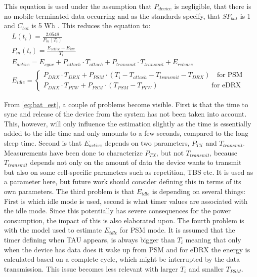 This equation is used under the assumption that $P_{device}$ is negligible, that there is no mobile terminated data occurring and as the standards specify, that $SF_{bat}$ is 1 and $C_{bat}$ is 5 Wh \citep[sec. 5.4]{safty_factor_standard}. This reduces the equation to:
\begin{equation}\label{eq:bat_est}
\begin{gathered}
    L(t_i) = \frac{2.0548}{P_m(T_i)} \\
    P_m(t_i) = \frac{E_{active} + E_{idle}}{T_i} \\
    E_{active} = E_{sync} + P_{attach}\cdot T_{attach} + P_{transmit}\cdot T_{transmit} + E_{release} \\
    E_{idle} = \begin{cases} P_{DRX}\cdot T_{DRX} + P_{PSM}\cdot (T_i - T_{attach} - T_{transmit} - T_{DRX}) \quad \text{for PSM}\\
                            P_{DRX}\cdot T_{PTW} + P_{PSM} \cdot (T_{PSM} - T_{PTW}) \qquad\qquad\qquad\quad\;\;\, \text{for eDRX}
                \end{cases}
\end{gathered}
\end{equation}

From \autoref{eq:bat_est}, a couple of problems become visible. 
First is that the time to sync and release of the device from the system has not been taken into account. This, however, will only influence the estimation slightly as the time is essentially added to the idle time and only amounts to a few seconds, compared to the long sleep time. 
Second is that $E_{active}$ depends on two parameters, $P_{TX}$ and $T_{transmit}$. Measurements have been done to characterize $P_{TX}$, but not $T_{transmit}$, because $T_{transmit}$ depends not only on the amount of data the device wants to transmit but also on some cell-specific parameters such as repetition, TBS etc. It is used as a parameter here, but future work should consider defining this in terms of its own parameters. 
The third problem is that $E_{idle}$ is depending on several things: First is which idle mode is used, second is what timer values are associated with the idle mode. Since this potentially has severe consequences for the power consumption, the impact of this is also elaborated upon. 
The fourth problem is with the model used to estimate $E_{idle}$ for PSM mode. It is assumed that the timer defining when \gls{TAU} appears, is always bigger than $T_i$ meaning that only when the device has data does it wake up from PSM and for eDRX the energy is calculated based on a complete cycle, which might be interrupted by the data transmission. This issue becomes less relevant with larger $T_i$ and smaller $T_{PSM}$. 

